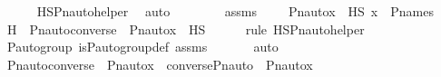 \begin{isabellebody}
\ \ \ \ \isamarkupfalse%
\ HS{\isacharunderscore}{\kern0pt}Pn{\isacharunderscore}{\kern0pt}auto{\isacharunderscore}{\kern0pt}helper\ \isamarkupfalse%
\ auto\isanewline
{}\isamarkupfalse%
\ \isanewline
\ \ \isamarkupfalse%
\ {\isasympi}\ \isamarkupfalse%
\ assms\ {\isacharcolon}{\kern0pt}\ {\isachardoublequoteopen}{\isasympi}\ {\isasymin}\ {\isasymG}{\isachardoublequoteclose}\ {\isachardoublequoteopen}Pn{\isacharunderscore}{\kern0pt}auto{\isacharparenleft}{\kern0pt}{\isasympi}{\isacharparenright}{\kern0pt}{\isacharbackquote}{\kern0pt}x\ {\isasymin}\ HS{\isachardoublequoteclose}\ {\isachardoublequoteopen}x\ {\isasymin}\ P{\isacharunderscore}{\kern0pt}names{\isachardoublequoteclose}\isanewline
\ \ \isamarkupfalse%
\ H\ {\isacharcolon}{\kern0pt}\ {\isachardoublequoteopen}Pn{\isacharunderscore}{\kern0pt}auto{\isacharparenleft}{\kern0pt}converse{\isacharparenleft}{\kern0pt}{\isasympi}{\isacharparenright}{\kern0pt}{\isacharparenright}{\kern0pt}\ {\isacharbackquote}{\kern0pt}\ {\isacharparenleft}{\kern0pt}Pn{\isacharunderscore}{\kern0pt}auto{\isacharparenleft}{\kern0pt}{\isasympi}{\isacharparenright}{\kern0pt}{\isacharbackquote}{\kern0pt}x{\isacharparenright}{\kern0pt}\ {\isasymin}\ HS{\isachardoublequoteclose}\ \isanewline
\ \ \ \ \isamarkupfalse%
{\isacharparenleft}{\kern0pt}rule\ HS{\isacharunderscore}{\kern0pt}Pn{\isacharunderscore}{\kern0pt}auto{\isacharunderscore}{\kern0pt}helper{\isacharparenright}{\kern0pt}\isanewline
\ \ \ \ \isamarkupfalse%
\ {\isasymG}{\isacharunderscore}{\kern0pt}P{\isacharunderscore}{\kern0pt}auto{\isacharunderscore}{\kern0pt}group\ is{\isacharunderscore}{\kern0pt}P{\isacharunderscore}{\kern0pt}auto{\isacharunderscore}{\kern0pt}group{\isacharunderscore}{\kern0pt}def\ assms\ \isanewline
\ \ \ \ \isamarkupfalse%
\ auto\isanewline
\ \ \isamarkupfalse%
\ {\isachardoublequoteopen}Pn{\isacharunderscore}{\kern0pt}auto{\isacharparenleft}{\kern0pt}converse{\isacharparenleft}{\kern0pt}{\isasympi}{\isacharparenright}{\kern0pt}{\isacharparenright}{\kern0pt}\ {\isacharbackquote}{\kern0pt}\ {\isacharparenleft}{\kern0pt}Pn{\isacharunderscore}{\kern0pt}auto{\isacharparenleft}{\kern0pt}{\isasympi}{\isacharparenright}{\kern0pt}{\isacharbackquote}{\kern0pt}x{\isacharparenright}{\kern0pt}\ {\isacharequal}{\kern0pt}\ converse{\isacharparenleft}{\kern0pt}Pn{\isacharunderscore}{\kern0pt}auto{\isacharparenleft}{\kern0pt}{\isasympi}{\isacharparenright}{\kern0pt}{\isacharparenright}{\kern0pt}\ {\isacharbackquote}{\kern0pt}\ {\isacharparenleft}{\kern0pt}Pn{\isacharunderscore}{\kern0pt}auto{\isacharparenleft}{\kern0pt}{\isasympi}{\isacharparenright}{\kern0pt}{\isacharbackquote}{\kern0pt}x{\isacharparenright}{\kern0pt}{\isachardoublequoteclose}\isanewline

\end{isabellebody}
